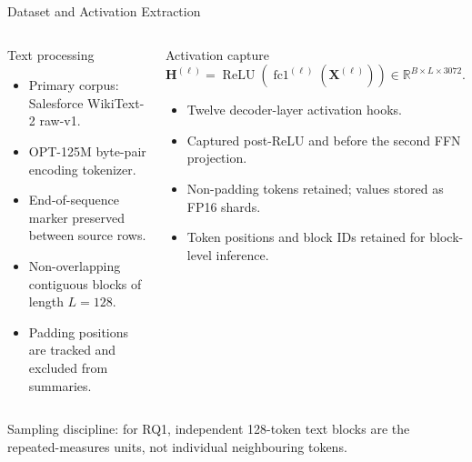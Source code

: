 \documentclass[aspectratio=169,10pt]{beamer}
\newcommand{\smallnote}[1]{{\scriptsize\color{Muted}#1}}
\newcommand{\ReLU}{\operatorname{ReLU}}
\newcommand{\R}{\mathbb{R}}
\begin{document}
\begin{frame}{Dataset and Activation Extraction}
\begin{columns}[T,onlytextwidth]
\begin{block}{Text processing}
\begin{itemize}
  \item Primary corpus: Salesforce WikiText-2 raw-v1.
  \item OPT-125M byte-pair encoding tokenizer.
  \item End-of-sequence marker preserved between source rows.
  \item Non-overlapping contiguous blocks of length $L=128$.
  \item Padding positions are tracked and excluded from summaries.
\end{itemize}
\end{block}
\begin{block}{Activation capture}
\[
\mathbf{H}^{(\ell)}=\ReLU\!\left(\operatorname{fc1}^{(\ell)}(\mathbf{X}^{(\ell)})\right)
\in\R^{B\times L\times 3072}.
\]
\begin{itemize}
  \item Twelve decoder-layer activation hooks.
  \item Captured post-ReLU and before the second FFN projection.
  \item Non-padding tokens retained; values stored as FP16 shards.
  \item Token positions and block IDs retained for block-level inference.
\end{itemize}
\end{block}
\end{columns}
\vspace{2pt}
\smallnote{Sampling discipline: for RQ1, independent 128-token text blocks are the repeated-measures units, not individual neighbouring tokens.}
\end{frame}
\end{document}
